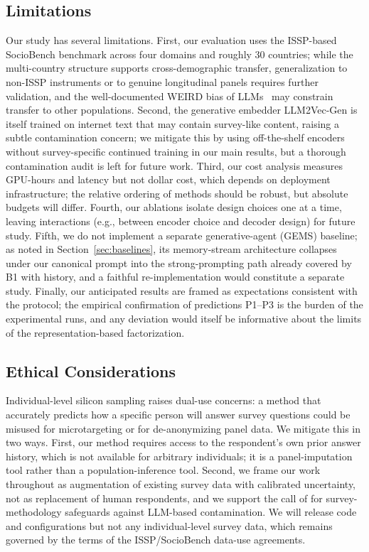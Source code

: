 \subsection{Limitations}
Our study has several limitations. First, our evaluation uses the ISSP-based SocioBench benchmark across four domains and roughly 30 countries; while the multi-country structure supports cross-demographic transfer, generalization to non-ISSP instruments or to genuine longitudinal panels requires further validation, and the well-documented WEIRD bias of LLMs~\citep{bail2024generative} may constrain transfer to other populations. Second, the generative embedder LLM2Vec-Gen is itself trained on internet text that may contain survey-like content, raising a subtle contamination concern; we mitigate this by using off-the-shelf encoders without survey-specific continued training in our main results, but a thorough contamination audit is left for future work. Third, our cost analysis measures GPU-hours and latency but not dollar cost, which depends on deployment infrastructure; the relative ordering of methods should be robust, but absolute budgets will differ. Fourth, our ablations isolate design choices one at a time, leaving interactions (e.g., between encoder choice and decoder design) for future study. Fifth, we do not implement a separate generative-agent (GEMS) baseline; as noted in Section~\ref{sec:baselines}, its memory-stream architecture collapses under our canonical prompt into the strong-prompting path already covered by B1 with history, and a faithful re-implementation would constitute a separate study. Finally, our anticipated results are framed as expectations consistent with the protocol; the empirical confirmation of predictions P1--P3 is the burden of the experimental runs, and any deviation would itself be informative about the limits of the representation-based factorization.

\subsection{Ethical Considerations}
Individual-level silicon sampling raises dual-use concerns: a method that accurately predicts how a specific person will answer survey questions could be misused for microtargeting or for de-anonymizing panel data. We mitigate this in two ways. First, our method requires access to the respondent's own prior answer history, which is not available for arbitrary individuals; it is a panel-imputation tool rather than a population-inference tool. Second, we frame our work throughout as augmentation of existing survey data with calibrated uncertainty, not as replacement of human respondents, and we support the call of \citet{westwood2025potential} for survey-methodology safeguards against LLM-based contamination. We will release code and configurations but not any individual-level survey data, which remains governed by the terms of the ISSP/SocioBench data-use agreements.
